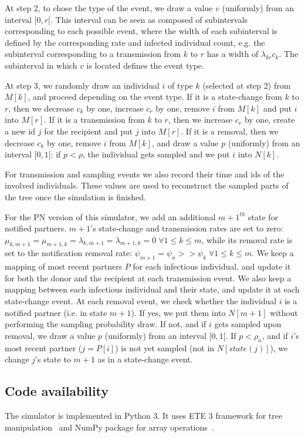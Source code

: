 \documentclass[a4paper,10pt]{article}
\begin{document}
At step 2, to chose the type of the event, we draw a value $v$ (uniformly) from an interval $[0, r[$. This interval can be seen as composed of subintervals corresponding to each possible event, where the width of each subinterval is defined by the corresponding rate and infected individual count, e.g. the subinterval corresponding to a transmission from $k$ to $r$ has a width of $\lambda_{kr}c_k$. The subinterval in which $v$ is located defines the event type.

At step 3, we randomly draw an individual $i$ of type $k$ (selected at step 2) from $M[k]$, and proceed depending on the event type. If it is a state-change from $k$ to $r$, then we decrease $c_k$ by one, increase $c_r$ by one, remove $i$ from $M[k]$ and put $i$ into $M[r]$. If it is a transmission from $k$ to $r$, then we increase $c_r$ by one, create a new id $j$ for the recipient and put $j$ into $M[r]$. If it is a removal, then we decrease $c_k$ by one, remove $i$ from $M[k]$, and draw a value $p$ (uniformly) from an interval $[0, 1[$: if $p < \rho$, the individual gets sampled and we put $i$ into $N[k]$. 

For transmission and sampling events we also record their time and ids of the involved individuals. These values are used to reconstruct the sampled parts of the tree once the simulation is finished.


For the PN version of this simulator, we add an additional $m+1^{th}$ state for notified partners. $m + 1$'s state-change and transmission rates are set to zero: $\mu_{k,m+1} = \mu_{m+1,k} = \lambda_{k,m+1} = \lambda_{m+1,k} = 0\; \forall 1 \leq k \leq m$, while its removal rate is set to the notification removal rate: $\psi_{m+1} = \psi_n >> \psi_k\; \forall 1 \leq k \leq m$. We keep a mapping of most recent partners $P$ for each infectious individual, and update it for both the donor and the recipient at each transmission event. We also keep a mapping between each infectious individual and their state, and update it at each state-change event. At each removal event, we check whether the individual $i$ is a notified partner (i.e. in state $m+1$). If yes, we put them into $N[m+1]$ without performing the sampling probability draw. If not, and if $i$ gets sampled upon removal, we draw a value $p$ (uniformly) from an interval $[0, 1[$. If $p < \rho_n$, and if $i$'s most recent partner ($j = P[i]$) is not yet sampled (not in $N[state(j)]$), we change $j$'s state to $m + 1$ as in a state-change event.


\subsection*{Code availability}
The simulator is implemented in Python 3. It uses ETE 3 framework for tree manipulation~\cite{Huerta-Cepas2016} and NumPy package for array operations~\cite{harris_array_2020}. 
\end{document}
